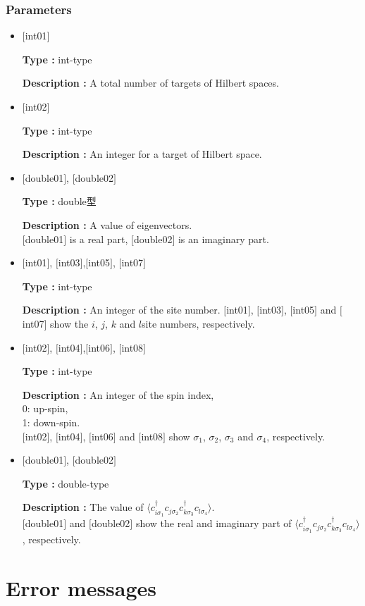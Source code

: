 \subsubsection{Parameters}
 \begin{itemize}

  \item  $[$int01$]$

 {\bf Type :} int-type

{\bf Description :}  A total number of targets of Hilbert spaces.
 
  \item  $[$int02$]$

 {\bf Type :} int-type

{\bf Description :} An integer for a target of Hilbert space.

 \item  $[$double01$]$, $[$double02$]$

 {\bf Type :} double型 

{\bf Description :} A value of eigenvectors.\\
$[$double01$]$ is a real part, $[$double02$]$ is an imaginary part.\\


  \item  $[$int01$]$, $[$int03$]$,$[$int05$]$, $[$int07$]$

 {\bf Type :} int-type

{\bf Description :} 
An integer of the site number. $[$int01$]$, $[$int03$]$, $[$int05$]$ and $[$int07$]$  show the $i$, $j$, $k$ and $l$site numbers, respectively.
 
  \item  $[$int02$]$, $[$int04$]$,$[$int06$]$, $[$int08$]$

 {\bf Type :} int-type 

{\bf Description :} An integer of the spin index,\\
   0: up-spin,\\
   1: down-spin.\\ 
$[$int02$]$, $[$int04$]$, $[$int06$]$ and $[$int08$]$ show $\sigma_1$, $\sigma_2$, $\sigma_3$ and $\sigma_4$,  respectively. 
  \item  $[$double01$]$, $[$double02$]$

 {\bf Type :} double-type 

{\bf Description :} The value of $\langle c_{i\sigma_1}^{\dagger}c_{j\sigma_2}c_{k\sigma_3}^{\dagger}c_{l\sigma_4}\rangle$.\\
$[$double01$]$ and $[$double02$]$ show the real and imaginary part of $\langle c_{i\sigma_1}^{\dagger}c_{j\sigma_2}c_{k\sigma_3}^{\dagger}c_{l\sigma_4}\rangle$, respectively.

\end{itemize}

\newpage

\section{Error messages}


 
